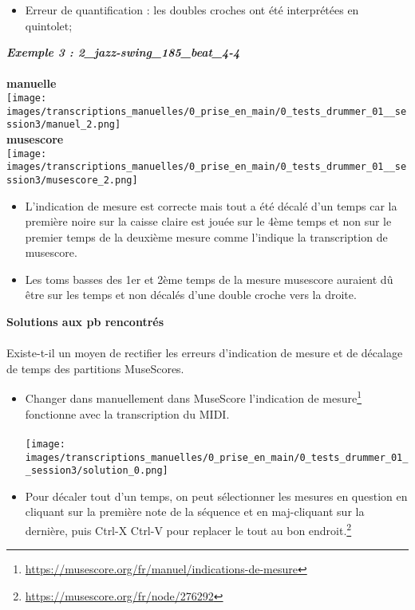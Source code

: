 \begin{itemize}
	\item Erreur de quantification : les doubles croches ont été interprétées en quintolet;\\
\end{itemize}
\textbf{\textit{Exemple 3 : 2\_jazz-swing\_185\_beat\_4-4}}
\\\\
\textbf{manuelle}\\
\texttt{[image: images/transcriptions\_manuelles/0\_prise\_en\_main/0\_tests\_drummer\_01\_\_session3/manuel\_2.png]} \\
\textbf{musescore}\\
\texttt{[image: images/transcriptions\_manuelles/0\_prise\_en\_main/0\_tests\_drummer\_01\_\_session3/musescore\_2.png]} \\
\begin{itemize}
	\item L’indication de mesure est correcte mais tout a été décalé d’un temps car la première noire sur la caisse claire est jouée sur le 4ème temps et non sur le premier temps de la deuxième mesure comme l’indique la transcription de musescore.
	\item Les toms basses des 1er et 2ème temps de la mesure musescore auraient dû être sur les temps et non décalés d’une double croche vers la droite.\\
\end{itemize}
\textbf{Solutions aux pb rencontrés}\\\\
Existe-t-il un moyen de rectifier les erreurs d’indication de mesure et de décalage de temps des partitions MuseScores.\\
\begin{itemize}
	\item Changer dans manuellement dans MuseScore l’indication de mesure\footnote{\url{https://musescore.org/fr/manuel/indications-de-mesure}} fonctionne avec la transcription du MIDI. \\\\ \texttt{[image: images/transcriptions\_manuelles/0\_prise\_en\_main/0\_tests\_drummer\_01\_\_session3/solution\_0.png]} \\
	\item Pour décaler tout d’un temps, on peut sélectionner les mesures en question en cliquant sur la première note de la séquence et en maj-cliquant sur la dernière, puis Ctrl-X Ctrl-V pour replacer le tout au bon endroit.\footnote{\url{https://musescore.org/fr/node/276292}}\\
\end{itemize}

